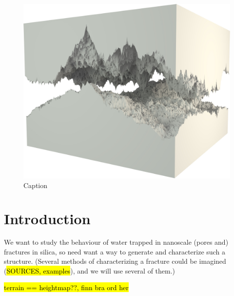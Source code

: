 \begin{figure}[htpb]%
    \centering%
    \includegraphics[width=\textwidth]{images/fracture/large_fracture05.jpg}%
    \caption{Caption}%
\end{figure}%

\chapter{Introduction}
We want to study the behaviour of water trapped in nanoscale (pores and) fractures in silica, so need want a way to generate and characterize such a structure. (Several methods of characterizing a fracture could be imagined (\hl{SOURCES, examples}), and we will use several of them.)        

\hl{terrain == heightmap??, finn bra ord her}


